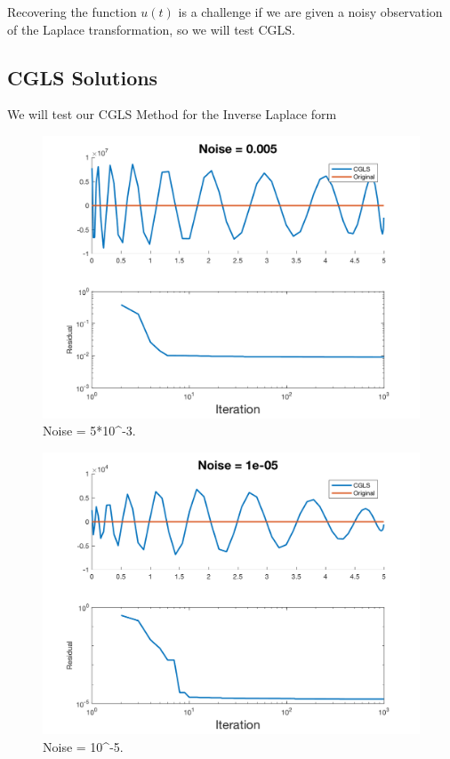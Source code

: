 \documentclass{article}
\begin{document}
Recovering the function $u(t)$ is a challenge if we are given a noisy observation of the Laplace transformation, so we will test CGLS.


\subsection{CGLS Solutions}

We will test our CGLS Method for the Inverse Laplace form

\begin{figure}[H]
    \centerline{
    \includegraphics[height = 10 cm]{Laplace_5e-3.png}
    }
    \caption{\label{fig:Laplace_5e-3} Noise = 5*10^{-3}.}
\end{figure}

\begin{figure}[H]
    \centerline{
    \includegraphics[height = 10 cm]{Laplace_1e-05.png}
    }
    \caption{\label{fig:Laplace_1e-05} Noise = 10^{-5}.}
\end{figure}
\end{document}
